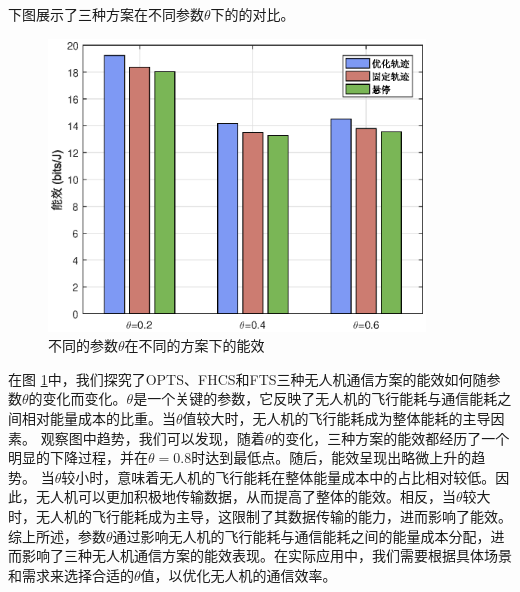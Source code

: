 下图展示了三种方案在不同参数$\theta$下的的对比。
\begin{figure}[H]
\centering
\includegraphics[width=10cm]{..//figures//chap4//不同的参数在不同的方案下的能效.eps}
\caption{不同的参数$\theta$在不同的方案下的能效}
\label{不同的参数在不同的方案下的能效}
\end{figure}

在图 \ref{不同的参数在不同的方案下的能效}中，我们探究了OPTS、FHCS和FTS三种无人机通信方案的能效如何随参数$\theta$的变化而变化。$\theta$是一个关键的参数，它反映了无人机的飞行能耗与通信能耗之间相对能量成本的比重。当$\theta$值较大时，无人机的飞行能耗成为整体能耗的主导因素。
观察图中趋势，我们可以发现，随着$\theta$的变化，三种方案的能效都经历了一个明显的下降过程，并在$\theta=0.8$时达到最低点。随后，能效呈现出略微上升的趋势。
当$\theta$较小时，意味着无人机的飞行能耗在整体能量成本中的占比相对较低。因此，无人机可以更加积极地传输数据，从而提高了整体的能效。相反，当$\theta$较大时，无人机的飞行能耗成为主导，这限制了其数据传输的能力，进而影响了能效。
综上所述，参数$\theta$通过影响无人机的飞行能耗与通信能耗之间的能量成本分配，进而影响了三种无人机通信方案的能效表现。在实际应用中，我们需要根据具体场景和需求来选择合适的$\theta$值，以优化无人机的通信效率。

